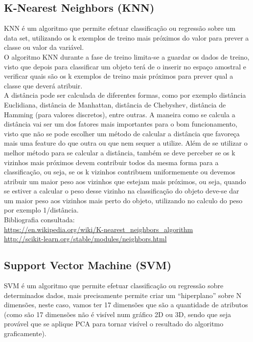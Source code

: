 \documentclass[portugues,final]{revdetua}
\begin{document}
\subsection{K-Nearest Neighbors (KNN)}

KNN é um algoritmo que permite efetuar classificação ou regressão sobre um data set, utilizando os k exemplos de treino mais próximos do valor para prever a classe ou valor da variável.\\

O algoritmo KNN durante a fase de treino limita-se a guardar os dados de treino, visto que depois para classificar um objeto terá de o inserir no espaço amostral e verificar quais são os k exemplos de treino mais próximos para prever qual a classe que deverá atribuir.\\

A distância pode ser calculada de diferentes formas, como por exemplo distância Euclidiana, distância de Manhattan, distância de Chebyshev, distância de Hamming (para valores discretos), entre outras. A maneira como se calcula a distância vai ser um dos fatores mais importantes para o bom funcionamento, visto que não se pode escolher um método de calcular a distância que favoreça mais uma feature do que outra ou que nem sequer a utilize. Além de se utilizar o melhor método para se calcular a distância, também se deve perceber se os k vizinhos mais próximos devem contribuir todos da mesma forma para a classificação, ou seja, se os k vizinhos contribuem uniformemente ou devemos atribuir um maior peso aos vizinhos que estejam mais próximos, ou seja, quando se estiver a calcular o peso desse vizinho na classificação do objeto deve-se dar um maior peso aos vizinhos mais perto do objeto, utilizando no calculo do peso por exemplo 1/distância.\\

Bibliografia consultada:\\
\url{https://en.wikipedia.org/wiki/K-nearest_neighbors_algorithm}\\
\url{http://scikit-learn.org/stable/modules/neighbors.html}

\subsection{Support Vector Machine (SVM)}

SVM é um algoritmo que permite efetuar classificação ou regressão sobre determinados dados, mais precisamente permite criar um “hiperplano” sobre N dimensões, neste caso, vamos ter 17 dimensões que são a quantidade de atributos (como são 17 dimensões não é visível num gráfico 2D ou 3D, sendo que seja provável que se aplique PCA para tornar visível o resultado do algoritmo graficamente).\\
\end{document}
